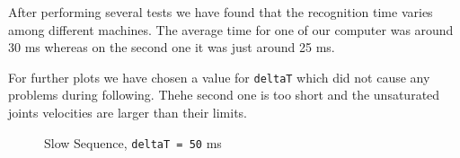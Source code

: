 \documentclass[]{scrartcl}
\begin{document}
After performing several tests we have found that the recognition time varies among different machines. The average time for one of our computer was around 30 ms whereas on the second one it was just around 25 ms.

For further plots we have chosen a value for \texttt{deltaT} which did not cause any problems during following. Thehe second one is too short and the unsaturated joints velocities are larger than their limits.

\begin{figure}[!htp]
	\hfill
	\caption{Slow Sequence, \texttt{deltaT = 50} ms}
	\label{fig:SlowSequence_dT50_following_error_vs_time}
\end{figure}
\end{document}

